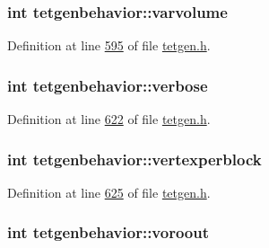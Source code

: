 \subsubsection[{\texorpdfstring{varvolume}{varvolume}}]{\setlength{\rightskip}{0pt plus 5cm}int tetgenbehavior\+::varvolume}\hypertarget{classtetgenbehavior_a59fc93472c81cfe360ddb76c7e008d8e}{}\label{classtetgenbehavior_a59fc93472c81cfe360ddb76c7e008d8e}


Definition at line \hyperlink{tetgen_8h_source_l00595}{595} of file \hyperlink{tetgen_8h_source}{tetgen.\+h}.

\subsubsection[{\texorpdfstring{verbose}{verbose}}]{\setlength{\rightskip}{0pt plus 5cm}int tetgenbehavior\+::verbose}\hypertarget{classtetgenbehavior_a11376e8556a93b4ccc0472ca7db84d2e}{}\label{classtetgenbehavior_a11376e8556a93b4ccc0472ca7db84d2e}


Definition at line \hyperlink{tetgen_8h_source_l00622}{622} of file \hyperlink{tetgen_8h_source}{tetgen.\+h}.

\subsubsection[{\texorpdfstring{vertexperblock}{vertexperblock}}]{\setlength{\rightskip}{0pt plus 5cm}int tetgenbehavior\+::vertexperblock}\hypertarget{classtetgenbehavior_a0706697ee85e4d4c7ea4b581df3c0786}{}\label{classtetgenbehavior_a0706697ee85e4d4c7ea4b581df3c0786}


Definition at line \hyperlink{tetgen_8h_source_l00625}{625} of file \hyperlink{tetgen_8h_source}{tetgen.\+h}.

\subsubsection[{\texorpdfstring{voroout}{voroout}}]{\setlength{\rightskip}{0pt plus 5cm}int tetgenbehavior\+::voroout}\hypertarget{classtetgenbehavior_a803f05aaa63121d3228b96573c5b2488}{}\label{classtetgenbehavior_a803f05aaa63121d3228b96573c5b2488}


